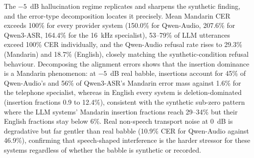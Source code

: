 The $-5$~dB hallucination regime replicates and sharpens the synthetic
finding, and the error-type decomposition locates it precisely. Mean
Mandarin CER exceeds 100\% for every provider system (150.0\% for
Qwen-Audio, 207.6\% for Qwen3-ASR, 164.4\% for the 16~kHz specialist), 53--79\% of
LLM utterances exceed 100\% CER individually, and the Qwen-Audio refusal
rate rises to 29.3\% (Mandarin) and 18.7\% (English), closely matching
the synthetic-condition refusal behaviour. Decomposing the alignment
errors shows that the insertion dominance is a Mandarin phenomenon: at
$-5$~dB real babble, insertions account for 45\% of Qwen-Audio's and
56\% of Qwen3-ASR's Mandarin error mass against 1.6\% for the telephone
specialist, whereas in English every system is deletion-dominated
(insertion fractions 0.9 to 12.4\%), consistent with the synthetic
sub-zero pattern where the LLM systems' Mandarin insertion fractions reach
29--34\% but their English fractions stay below 6\%. Real non-speech
transport noise at 0~dB is degradative but far gentler than real babble
(10.9\% CER for Qwen-Audio against 46.9\%), confirming that
speech-shaped interference is the harder stressor for these systems
regardless of whether the babble is synthetic or recorded.

